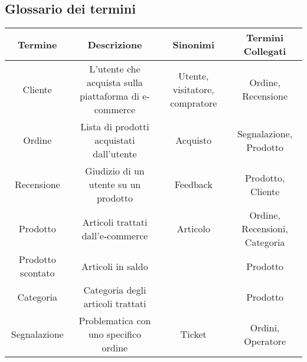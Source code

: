 \subsection{Glossario dei termini}
\begin{center}
\begin{tabular}{ |c|c|c|c|} 
\hline
Termine & Descrizione & Sinonimi & Termini Collegati \\
\hline
\multirow{3}{6em}{Cliente} & \multirow{3}{12em}{L'utente che acquista sulla piattaforma di e-commerce} & \multirow{3}{8em}{Utente, visitatore, compratore} & \multirow{3}{12em}{Ordine, Recensione} \\
 &  &  & \\
 &  &  & \\
\hline

\multirow{3}{6em}{Ordine} & \multirow{3}{12em}{Lista di prodotti acquistati dall'utente} & \multirow{3}{8em}{Acquisto} & \multirow{3}{12em}{Segnalazione, Prodotto} \\
 &  &  & \\
 &  &  & \\
\hline

\multirow{3}{6em}{Recensione} & \multirow{3}{12em}{Giudizio di un utente su un prodotto} & \multirow{3}{8em}{Feedback} & \multirow{3}{12em}{Prodotto, Cliente} \\
 &  &  & \\
 &  &  & \\ 
\hline

\multirow{3}{6em}{Prodotto} & \multirow{3}{12em}{Articoli trattati dall'e-commerce} & \multirow{3}{8em}{Articolo} & \multirow{3}{12em}{Ordine, Recensioni, Categoria} \\
&  &  & \\
&  &  & \\ 
\hline

\multirow{3}{6em}{Prodotto scontato} & \multirow{3}{12em}{Articoli in saldo} & \multirow{3}{8em}{} & \multirow{3}{12em}{Prodotto} \\
&  &  & \\
&  &  & \\ 
\hline

\multirow{3}{6em}{Categoria} & \multirow{3}{12em}{Categoria degli articoli trattati} & \multirow{3}{8em}{} & \multirow{3}{12em}{Prodotto} \\
&  &  & \\
&  &  & \\ 
\hline


\multirow{3}{6em}{Segnalazione} & \multirow{3}{12em}{Problematica con uno specifico ordine} & \multirow{3}{8em}{Ticket} & \multirow{3}{12em}{Ordini, Operatore} \\
&  &  & \\
&  &  & \\ 
\hline


\end{tabular}
\end{center}
